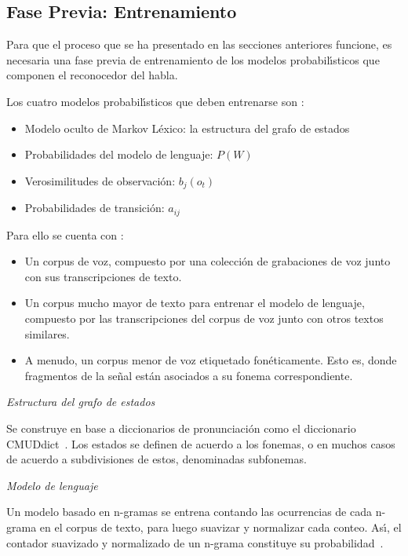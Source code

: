 \subsection{Fase Previa: Entrenamiento}
\label{sec:training}

Para que el proceso que se ha presentado en las secciones anteriores funcione, es necesaria una fase
previa de entrenamiento de los modelos probabil{\'\i}sticos que componen el reconocedor del habla. 

Los cuatro modelos probabil{\'\i}sticos que deben entrenarse son \cite{Jurafsky}:
\begin{itemize}
	\item Modelo oculto de Markov L\'exico: la estructura del grafo de estados
	\item Probabilidades del modelo de lenguaje: $P(W)$
	\item Verosimilitudes de observaci\'on: $b_j(o_t)$
	\item Probabilidades de transici\'on: $a_{ij}$
\end{itemize}

Para ello se cuenta con \cite{Jurafsky}:
\begin{itemize}
	\item  Un corpus de voz, compuesto por una colecci\'on de grabaciones de voz junto
	con sus transcripciones de texto.
	\item  Un corpus mucho mayor de texto para entrenar el modelo de lenguaje, compuesto por las transcripciones
	del corpus de voz junto con otros textos similares.
	\item A menudo, un corpus menor de voz etiquetado fon\'eticamente. Esto es, donde fragmentos
	de la se\~nal est\'an asociados a su fonema correspondiente.
\end{itemize}

\emph{Estructura del grafo de estados} 

Se construye en base a diccionarios de pronunciaci\'on como el diccionario \mbox{CMUDdict \cite{CMUdict}}. 
Los estados se definen de acuerdo a los fonemas, o en muchos casos de acuerdo a subdivisiones de estos, denominadas subfonemas.

\emph{Modelo de lenguaje} 

Un modelo basado en n-gramas se entrena contando las ocurrencias de cada n-grama en el corpus de texto, para luego 
suavizar y normalizar cada conteo. As{\'\i}, el contador suavizado y normalizado de un n-grama constituye 
su \mbox{probabilidad \cite{CollinsLanguage}}.

